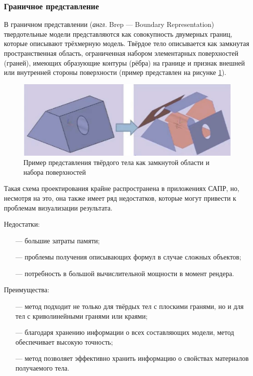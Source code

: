\subsubsection{Граничное представление}
В граничном представлении (\textit{англ.} Brep --- Boundary Representation) \cite{brep} твердотельные модели представляются как совокупность 
двумерных границ, которые описывают трёхмерную модель. 
Твёрдое тело описывается как замкнутая пространственная область, ограниченная набором элементарных поверхностей (граней), имеющих образующие контуры (рёбра) на границе и признак внешней или внутренней стороны поверхности (пример представлен на рисунке \ref{fig:brep}). \newpage

\begin{figure}[h]
	\centering
	\captionsetup{justification=centering}
	\includegraphics[width=\textwidth]{img/brep.png}
	\caption{Пример представления твёрдого тела как замкнутой области и набора поверхностей}
	\label{fig:brep}
\end{figure}

Такая схема проектирования крайне распространена в приложениях 
САПР, но, несмотря на это, она также имеет ряд недостатков, которые могут 
привести к проблемам визуализации результата.

Недостатки:
\begin{itemize}[leftmargin=1.6\parindent]
	\item[---] большие затраты памяти;
	\item[---] проблемы получения описывающих формул в случае сложных объектов;
	\item[---] потребность в большой вычислительной мощности в момент рендера.
\end{itemize}

Преимущества:
\begin{itemize}[leftmargin=1.6\parindent]
	\item[---] метод подходит не только для твёрдых тел с плоскими гранями, но и для 
	тел с криволинейными гранями или краями;
	\item[---] благодаря хранению информации о всех составляющих модели, метод 
	обеспечивает высокую точность;
	\item[---] метод позволяет эффективно хранить информацию о свойствах материалов получаемого тела.
\end{itemize}

